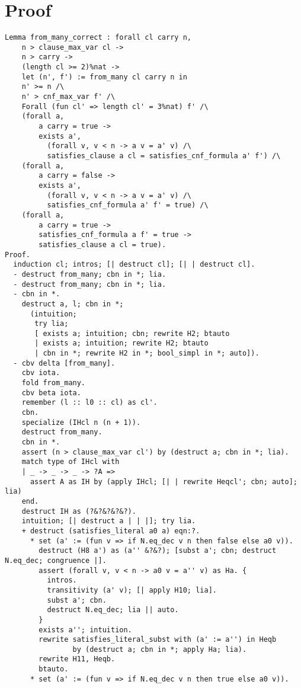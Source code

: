 \documentclass{article}
\begin{document}
\printbibliography

\appendix
\section{ Proof}

\begin{verbatim}
Lemma from_many_correct : forall cl carry n,
    n > clause_max_var cl ->
    n > carry ->
    (length cl >= 2)%nat ->
    let (n', f') := from_many cl carry n in
    n' >= n /\
    n' > cnf_max_var f' /\
    Forall (fun cl' => length cl' = 3%nat) f' /\
    (forall a,
        a carry = true ->
        exists a',
          (forall v, v < n -> a v = a' v) /\
          satisfies_clause a cl = satisfies_cnf_formula a' f') /\
    (forall a,
        a carry = false ->
        exists a',
          (forall v, v < n -> a v = a' v) /\
          satisfies_cnf_formula a' f' = true) /\
    (forall a,
        a carry = true ->
        satisfies_cnf_formula a f' = true ->
        satisfies_clause a cl = true).
Proof.
  induction cl; intros; [| destruct cl]; [| | destruct cl].
  - destruct from_many; cbn in *; lia.
  - destruct from_many; cbn in *; lia.
  - cbn in *.
    destruct a, l; cbn in *;
      (intuition;
       try lia;
       [ exists a; intuition; cbn; rewrite H2; btauto
       | exists a; intuition; rewrite H2; btauto
       | cbn in *; rewrite H2 in *; bool_simpl in *; auto]).
  - cbv delta [from_many].
    cbv iota.
    fold from_many.
    cbv beta iota.
    remember (l :: l0 :: cl) as cl'.
    cbn.
    specialize (IHcl n (n + 1)).
    destruct from_many.
    cbn in *.
    assert (n > clause_max_var cl') by (destruct a; cbn in *; lia).
    match type of IHcl with
    | _ -> _ -> _ -> ?A =>
      assert A as IH by (apply IHcl; [| | rewrite Heqcl'; cbn; auto]; lia)
    end.
    destruct IH as (?&?&?&?&?).
    intuition; [| destruct a | | |]; try lia.
    + destruct (satisfies_literal a0 a) eqn:?.
      * set (a' := (fun v => if N.eq_dec v n then false else a0 v)).
        destruct (H8 a') as (a'' &?&?); [subst a'; cbn; destruct N.eq_dec; congruence |].
        assert (forall v, v < n -> a0 v = a'' v) as Ha. {
          intros.
          transitivity (a' v); [| apply H10; lia].
          subst a'; cbn.
          destruct N.eq_dec; lia || auto.
        }
        exists a''; intuition.
        rewrite satisfies_literal_subst with (a' := a'') in Heqb
                by (destruct a; cbn in *; apply Ha; lia).
        rewrite H11, Heqb.
        btauto.
      * set (a' := (fun v => if N.eq_dec v n then true else a0 v)).

\end{verbatim}
\end{document}
